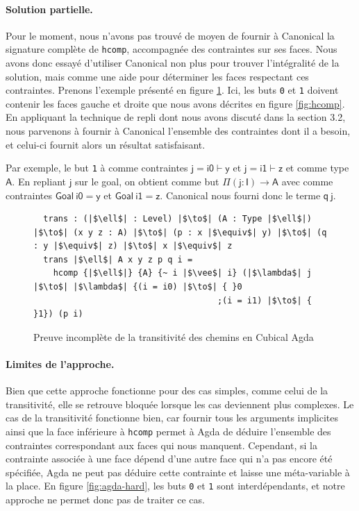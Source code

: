 \documentclass[11pt]{article}
\begin{document}
\paragraph{Solution partielle.}
Pour le moment, nous n'avons pas trouvé de moyen de fournir à Canonical la signature complète de \texttt{hcomp}, accompagnée des contraintes sur ses faces.
Nous avons donc essayé d'utiliser Canonical non plus pour trouver l'intégralité de la solution, 
mais comme une aide pour déterminer les faces respectant ces contraintes.
Prenons l'exemple présenté en figure \ref{fig:agda-trans}. 
Ici, les buts \texttt{0} et \texttt{1} doivent contenir les faces gauche et droite que nous avons décrites en figure \ref{fig:hcomp}.
En appliquant la technique de repli dont nous avons discuté dans la section 3.2, 
nous parvenons à fournir à Canonical l'ensemble des contraintes dont il a besoin, et celui-ci fournit alors un résultat satisfaisant.

Par exemple, le but \texttt{1} à comme contraintes $\mathsf{j = i0 \vdash y}$ et $\mathsf{j = i1 \vdash z}$ et comme type $\mathsf{A}$.
En repliant $\mathsf{j}$ sur le goal, on obtient comme but $\mathsf{\Pi (j : I) \to A}$ avec comme contraintes $\mathsf{Goal~i0 = y}$ et $\mathsf{Goal~i1 = z}$.
Canonical nous fourni donc le terme $\mathsf{q~j}$.

\begin{figure}[h]
\centering
\begin{verbatim}
  trans : (|$\ell$| : Level) |$\to$| (A : Type |$\ell$|) |$\to$| (x y z : A) |$\to$| (p : x |$\equiv$| y) |$\to$| (q : y |$\equiv$| z) |$\to$| x |$\equiv$| z
  trans |$\ell$| A x y z p q i = 
    hcomp {|$\ell$|} {A} {~ i |$\vee$| i} (|$\lambda$| j |$\to$| |$\lambda$| {(i = i0) |$\to$| { }0
                                     ;(i = i1) |$\to$| { }1}) (p i)
\end{verbatim}
\caption{Preuve incomplète de la transitivité des chemins en Cubical Agda}
\label{fig:agda-trans}
\end{figure}

\paragraph{Limites de l'approche.}
Bien que cette approche fonctionne pour des cas simples, comme celui de la transitivité, 
elle se retrouve bloquée lorsque les cas deviennent plus complexes.
Le cas de la transitivité fonctionne bien, 
car fournir tous les arguments implicites ainsi que la face inférieure à \texttt{hcomp} 
permet à Agda de déduire l'ensemble des contraintes correspondant aux faces qui nous manquent.
Cependant, si la contrainte associée à une face dépend d'une autre face qui n'a pas encore été spécifiée, 
Agda ne peut pas déduire cette contrainte et laisse une méta-variable à la place.
En figure \ref{fig:agda-hard}, les buts \texttt{0} et \texttt{1} sont interdépendants, et notre approche ne permet donc pas de traiter ce cas.
\end{document}
